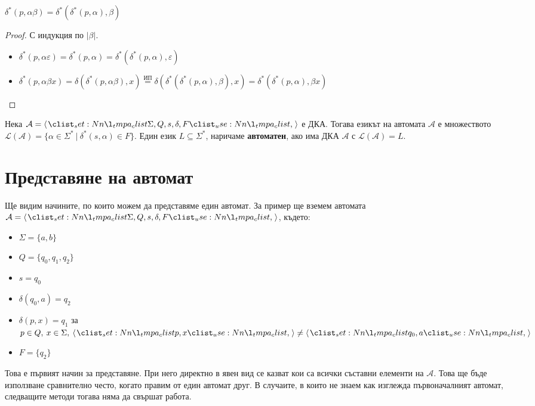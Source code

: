 \begin{claim}
    $\delta^*(p, \alpha \beta) = \delta^*(\delta^*(p, \alpha), \beta)$
\end{claim}

\begin{proof}
    С индукция по $|\beta|$.
    \begin{itemize}
        \item $\delta^*(p, \alpha \varepsilon) = \delta^*(p, \alpha) = \delta^*(\delta^*(p, \alpha), \varepsilon)$
        \item $\delta^*(p, \alpha \beta x) = \delta(\delta^*(p, \alpha \beta), x) \stackrel{\text{ИП}}{=} \delta(\delta^*(\delta^*(p, \alpha), \beta), x) = \delta^*(\delta^*(p, \alpha), \beta x)$
    \end{itemize}
\end{proof}

\begin{definition}
    Нека $\mathcal{A} = \opair{\Sigma, Q, s, \delta, F}$ е ДКА.
    Тогава езикът на автомата $\mathcal{A}$ е множеството
    $\mathcal{L}(\mathcal{A}) = \{ \alpha \in \Sigma^* \: | \: \delta^*(s, \alpha) \in F \}$.
    Един език $L \subseteq \Sigma^*$, наричаме \textbf{автоматен}, ако има ДКА $\mathcal{A}$ с $\mathcal{L}(\mathcal{A}) = L$.
\end{definition}

\section{Представяне на автомат}

Ще видим начините, по които можем да представяме един автомат.
За пример ще вземем автомата $\mathcal{A} = \opair{\Sigma, Q, s, \delta, F}$, където:
\begin{itemize}
    \item $\Sigma = \{ a, b \}$
    \item $Q = \{ q_0, q_1, q_2 \}$
    \item $s = q_0$
    \item $\delta(q_0, a) = q_2$
    \item $\delta(p, x) = q_1$ за $p \in Q, \: x \in \Sigma, \: \opair{p, x} \neq \opair{q_0, a}$
    \item $F = \{ q_2 \}$
\end{itemize}

Това е първият начин за представяне.
При него директно в явен вид се казват кои са всички съставни елементи на $\mathcal{A}$.
Това ще бъде използване сравнително често, когато правим от един автомат друг.
В случаите, в които не знаем как изглежда първоначалният автомат, следващите методи тогава няма да свършат работа. \\

